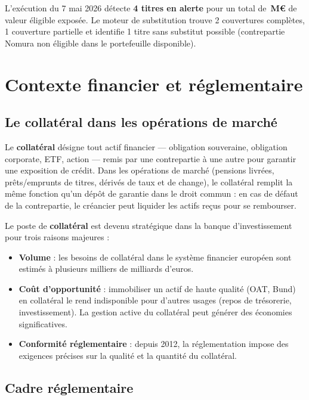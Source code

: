 \documentclass[12pt,a4paper]{article}
\newcommand{\millions}[1]{#1\,M\euro{}}
\begin{document}
\medskip

L'exécution du 7 mai 2026 détecte \textbf{4 titres en alerte} pour un total de
\textbf{\millions{}} de valeur éligible exposée. Le moteur de substitution
trouve 2 couvertures complètes, 1 couverture partielle et identifie 1 titre sans substitut
possible (contrepartie Nomura non éligible dans le portefeuille disponible).

\newpage
\section{Contexte financier et réglementaire}

\subsection{Le collatéral dans les opérations de marché}

Le \textbf{collatéral} désigne tout actif financier — obligation souveraine, obligation
corporate, ETF, action — remis par une contrepartie à une autre pour garantir une
exposition de crédit. Dans les opérations de marché (pensions livrées, prêts/emprunts
de titres, dérivés de taux et de change), le collatéral remplit la même fonction qu'un
dépôt de garantie dans le droit commun : en cas de défaut de la contrepartie, le
créancier peut liquider les actifs reçus pour se rembourser.

Le poste de \textbf{collatéral} est devenu stratégique dans la banque d'investissement
pour trois raisons majeures :

\begin{itemize}
  \item \textbf{Volume} : les besoins de collatéral dans le système financier européen
    sont estimés à plusieurs milliers de milliards d'euros.
  \item \textbf{Coût d'opportunité} : immobiliser un actif de haute qualité (OAT, Bund)
    en collatéral le rend indisponible pour d'autres usages (repos de trésorerie,
    investissement). La gestion active du collatéral peut générer des économies
    significatives.
  \item \textbf{Conformité réglementaire} : depuis 2012, la réglementation impose des
    exigences précises sur la qualité et la quantité du collatéral.
\end{itemize}

\subsection{Cadre réglementaire}
\end{document}

